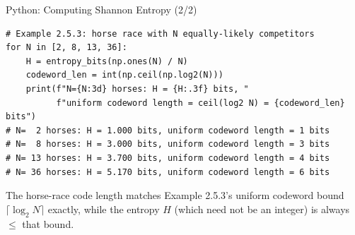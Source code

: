 \documentclass[aspectratio=169,10pt]{beamer}
\begin{document}
\begin{frame}[fragile]{Python: Computing Shannon Entropy (2/2)}
\begin{lstlisting}[style=python]
# Example 2.5.3: horse race with N equally-likely competitors
for N in [2, 8, 13, 36]:
    H = entropy_bits(np.ones(N) / N)
    codeword_len = int(np.ceil(np.log2(N)))
    print(f"N={N:3d} horses: H = {H:.3f} bits, "
          f"uniform codeword length = ceil(log2 N) = {codeword_len} bits")
# N=  2 horses: H = 1.000 bits, uniform codeword length = 1 bits
# N=  8 horses: H = 3.000 bits, uniform codeword length = 3 bits
# N= 13 horses: H = 3.700 bits, uniform codeword length = 4 bits
# N= 36 horses: H = 5.170 bits, uniform codeword length = 6 bits
\end{lstlisting}

\medskip
The horse-race code length matches Example 2.5.3's uniform codeword bound
$\lceil \log_2 N \rceil$ exactly, while the entropy $H$ (which need not be
an integer) is always $\le$ that bound.
\end{frame}
\end{document}
